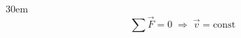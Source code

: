\documentclass[border=4pt]{standalone}
\begin{document}
\begin{varwidth}{30em}
\large
\[ \sum \vec{F} = 0 \;\Longrightarrow\; \vec{v} = \text{const} \]

\end{varwidth}
\end{document}
